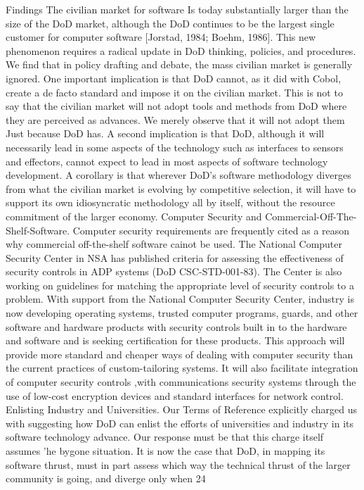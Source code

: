 \documentclass[12pt]{article}
\begin{document}
Findings
The civilian market for software Is today substantially larger than the size of
the DoD market, although the DoD continues to be the largest single customer
for computer software [Jorstad, 1984; Boehm, 1986].
This new phenomenon requires a radical update in DoD thinking, policies,
and procedures.
We find that in policy drafting and debate, the mass civilian market is generally
ignored.
One important implication is that DoD cannot, as it did with Cobol, create a de facto
standard and impose it on the civilian market. This is not to say that the civilian market
will not adopt tools and methods from DoD where they are perceived as advances. We
merely observe that it will not adopt them Just because DoD has.
A second implication is that DoD, although it will necessarily lead in some aspects of
the technology such as interfaces to sensors and effectors, cannot expect to lead in most
aspects of software technology development.
A corollary is that wherever DoD's software methodology diverges from what the
civilian market is evolving by competitive selection, it will have to support its own
idiosyncratic methodology all by itself, without the resource commitment of the larger
economy.
Computer Security and Commercial-Off-The-Shelf-Software. Computer security
requirements are frequently cited as a reason why commercial off-the-shelf software cainot
be used. The National Computer Security Center in NSA has published criteria for
assessing the effectiveness of security controls in ADP systems (DoD CSC-STD-001-83).
The Center is also working on guidelines for matching the appropriate level of security
controls to a problem. With support from the National Computer Security Center,
industry is now developing operating systems, trusted computer programs, guards, and
other software and hardware products with security controls built in to the hardware and
software and is seeking certification for these products. This approach will provide more
standard and cheaper ways of dealing with computer security than the current practices
of custom-tailoring systems. It will also facilitate integration of computer security controls
,with communications security systems through the use of low-cost encryption devices and
standard interfaces for network control.
Enlisting Industry and Universities. Our Terms of Reference explicitly charged us
with suggesting how DoD can enlist the efforts of universities and industry in its software
technology advance. Our response must be that this charge itself assumes 'he bygone
situation. It is now the case that DoD, in mapping its software thrust, must in part assess
which way the technical thrust of the larger community is going, and diverge only when
24
\end{document}
